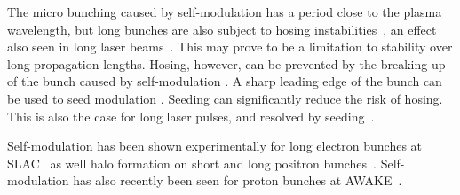 The micro bunching caused by self-modulation has a period close to the plasma wavelength, but long bunches are also subject to hosing instabilities~\cite{whittum:1991}, an effect also seen in long laser beams~\cite{duda:1999,duda:2000}.
This may prove to be a limitation to stability over long propagation lengths.
Hosing, however, can be prevented by the breaking up of the bunch caused by self-modulation \cite{vieira:2014}.
A sharp leading edge of the bunch can be used to seed modulation \cite{fang:2014}.
Seeding can significantly reduce the risk of hosing.
This is also the case for long laser pulses, and resolved by seeding~\cite{vieira:2012}. 

Self-modulation has been shown experimentally for long electron bunches at SLAC~\cite{muggli:2014,muggli:2015} as well halo formation on short and long positron bunches~\cite{muggli:2008,hogan:2003}.
Self-modulation has also recently been seen for proton bunches at AWAKE~\cite{muggli:2017a}.

